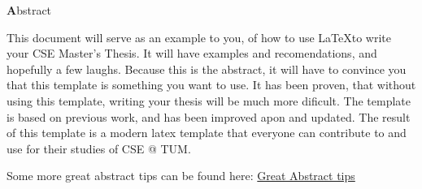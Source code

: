 
\clearemptydoublepage
{}
{}

\vspace*{2cm}
\begin{center}
{\Large \textbf Abstract}
\end{center}
\vspace{1cm}

This document will serve as an example to you, of how to use \LaTeX to write your
CSE Master's Thesis. It will have examples and recomendations, and hopefully a
few laughs.  Because this is the abstract, it will have to convince you that this 
template is something you want to use.  It has been proven, that without using
this template, writing your thesis will be much more dificult. The template is
based on previous work, and has been improved apon and updated.  The result of 
this template is a modern latex template that everyone can contribute to and use
for their studies of CSE @ TUM.

Some more great abstract tips can be found here: 
\href{https://users.ece.cmu.edu/~koopman/essays/abstract.html}{Great Abstract tips}
